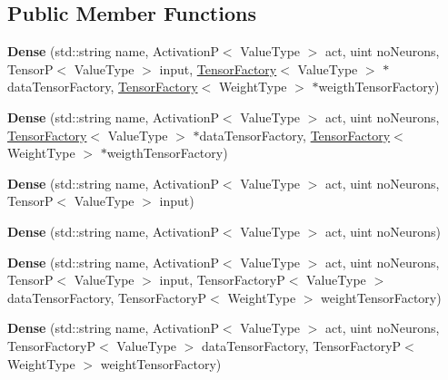 \subsection*{Public Member Functions}
\begin{DoxyCompactItemize}
\item 
\mbox{\label{classDense_accea6109fab79bbd26800c7367e26857}} 
{\bfseries Dense} (std\+::string name, ActivationP$<$ Value\+Type $>$ act, uint no\+Neurons, TensorP$<$ Value\+Type $>$ input, \hyperlink{classTensorFactory}{Tensor\+Factory}$<$ Value\+Type $>$ $\ast$data\+Tensor\+Factory, \hyperlink{classTensorFactory}{Tensor\+Factory}$<$ Weight\+Type $>$ $\ast$weigth\+Tensor\+Factory)
\item 
\mbox{\label{classDense_acfbc00b146e67de2f82502ee0696eeab}} 
{\bfseries Dense} (std\+::string name, ActivationP$<$ Value\+Type $>$ act, uint no\+Neurons, \hyperlink{classTensorFactory}{Tensor\+Factory}$<$ Value\+Type $>$ $\ast$data\+Tensor\+Factory, \hyperlink{classTensorFactory}{Tensor\+Factory}$<$ Weight\+Type $>$ $\ast$weigth\+Tensor\+Factory)
\item 
\mbox{\label{classDense_a3ee6122ece50f43ce752d244b5207aaf}} 
{\bfseries Dense} (std\+::string name, ActivationP$<$ Value\+Type $>$ act, uint no\+Neurons, TensorP$<$ Value\+Type $>$ input)
\item 
\mbox{\label{classDense_a81f4283f40d537465f7d6da62b6749b6}} 
{\bfseries Dense} (std\+::string name, ActivationP$<$ Value\+Type $>$ act, uint no\+Neurons)
\item 
\mbox{\label{classDense_af1260b026220a907e2d97933acb3c016}} 
{\bfseries Dense} (std\+::string name, ActivationP$<$ Value\+Type $>$ act, uint no\+Neurons, TensorP$<$ Value\+Type $>$ input, Tensor\+FactoryP$<$ Value\+Type $>$ data\+Tensor\+Factory, Tensor\+FactoryP$<$ Weight\+Type $>$ weight\+Tensor\+Factory)
\item 
\mbox{\label{classDense_a7a6c03d898aa2fd991ce488bfe2badc4}} 
{\bfseries Dense} (std\+::string name, ActivationP$<$ Value\+Type $>$ act, uint no\+Neurons, Tensor\+FactoryP$<$ Value\+Type $>$ data\+Tensor\+Factory, Tensor\+FactoryP$<$ Weight\+Type $>$ weight\+Tensor\+Factory)
\item 

\end{DoxyCompactItemize}
